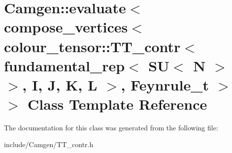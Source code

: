 \hypertarget{a00176}{}\section{Camgen\+:\+:evaluate$<$ compose\+\_\+vertices$<$ colour\+\_\+tensor\+:\+:T\+T\+\_\+contr$<$ fundamental\+\_\+rep$<$ S\+U$<$ N $>$ $>$, I, J, K, L $>$, Feynrule\+\_\+t $>$ $>$ Class Template Reference}
\label{a00176}


The documentation for this class was generated from the following file\+:\begin{DoxyCompactItemize}
\item 
include/\+Camgen/T\+T\+\_\+contr.\+h\end{DoxyCompactItemize}
